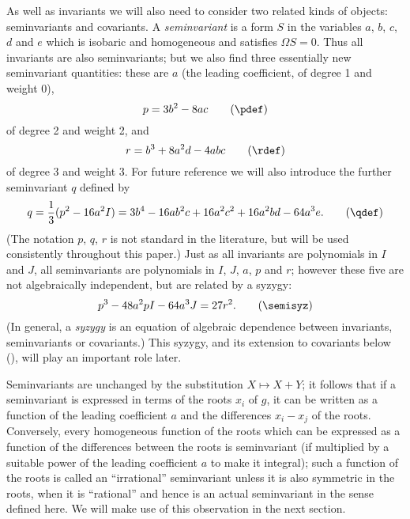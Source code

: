 As well as invariants we will also need to consider two related kinds
of objects: seminvariants and covariants.  A {\it seminvariant\/} is a
form $S$ in the variables $a$, $b$, $c$, $d$ and $e$ which is isobaric
and homogeneous and satisfies $\Omega S=0$.  Thus all invariants are
also seminvariants; but we also find three essentially new
seminvariant quantities: these are $a$ (the leading coefficient, of
degree 1 and weight 0), 
$$
  p=3b^2-8ac \tag\pdef
$$
of degree 2 and weight 2, and 
$$
  r=b^3+8a^2d-4abc \tag\rdef
$$
of degree 3 and weight 3.  For future reference we will also introduce
the further seminvariant $q$ defined by
$$
  q = \frac13(p^2-16a^2I) = 3b^4-16ab^2c+16a^2c^2+16a^2bd-64a^3e. \tag\qdef
$$
(The notation $p$, $q$, $r$ is not standard in the literature, but
will be used consistently throughout this paper.)  Just as all
invariants are polynomials in $I$ and $J$, all seminvariants are
polynomials in $I$, $J$, $a$, $p$ and $r$; however these five are not
algebraically independent, but are related by a syzygy:
$$
   p^3-48a^2pI-64a^3J = 27r^2. \tag\semisyz
$$
(In general, a {\it syzygy\/} is an equation of algebraic dependence
between invariants, seminvariants or covariants.)  This syzygy, and
its extension to covariants below (\covarsyz), will play an important
role later.

Seminvariants are unchanged by the substitution $X\mapsto X+Y$; it
follows that if a seminvariant is expressed in terms of the roots
$x_i$ of $g$, it can be written as a function of the leading
coefficient $a$ and the differences $x_i-x_j$ of the roots.
Conversely, every homogeneous function of the roots which can be
expressed as a function of the differences between the roots is
seminvariant (if multiplied by a suitable power of the leading
coefficient $a$ to make it integral); such a function of the roots is
called an ``irrational'' seminvariant unless it is also symmetric in
the roots, when it is ``rational'' and hence is an actual seminvariant
in the sense defined here.  We will make use of this observation in
the next section.

